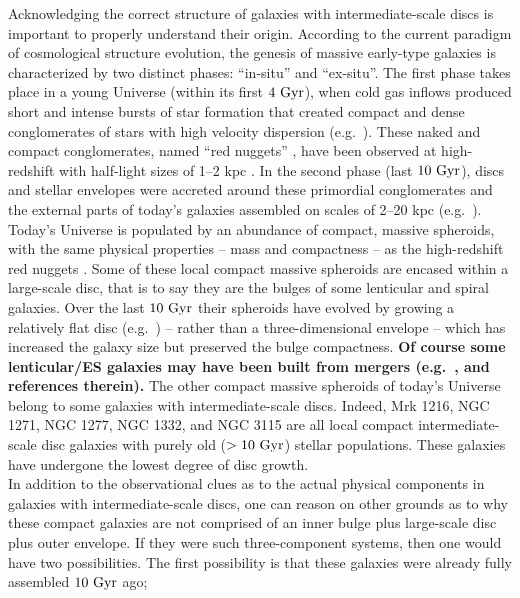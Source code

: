 \documentclass[useAMS,usenatbib,article]{mnras}
\begin{document}
Acknowledging the correct structure of galaxies with intermediate-scale discs is important to properly understand their origin. 
According to the current paradigm of cosmological structure evolution, 
the genesis of massive early-type galaxies is characterized by two distinct phases: ``in-situ'' and ``ex-situ''. 
The first phase takes place in a young Universe (within its first $4~\rm Gyr$), 
when cold gas inflows produced short and intense bursts of star formation 
that created compact and dense conglomerates of stars with high velocity dispersion (e.g.~\citealt{prieto2013}). 
These naked and compact conglomerates, named ``red nuggets'' \citep{damjanov2009}, 
have been observed at high-redshift with half-light sizes of 1--2 kpc \citep{daddi2005,trujillo2006,vandokkum2008}.
In the second phase (last $10~\rm Gyr$), discs and stellar envelopes 
were accreted around these primordial conglomerates and the external parts of today's galaxies assembled on scales of 2--20 kpc 
(e.g.~\citealt{driver2013}). \\
Today's Universe is populated by an abundance of compact, massive spheroids, 
with the same physical properties -- mass and compactness -- as the high-redshift red nuggets \citep{graham2013review,GDS2015}. 
Some of these local compact massive spheroids are encased within a large-scale disc, 
that is to say they are the bulges of some lenticular and spiral galaxies.  
Over the last $10~\rm Gyr$ their spheroids have evolved by growing a relatively flat disc (e.g.~\citealt{pichon2011,danovich2012,stewart2013})
-- rather than a three-dimensional envelope -- 
which has increased the galaxy size but preserved the bulge compactness. 
{\bf Of course some lenticular/ES galaxies may have been built from mergers (e.g.~\citealt{querejeta2015}, and references therein). }
The other compact massive spheroids of today's Universe belong to some galaxies with intermediate-scale discs. 
Indeed, Mrk 1216, NGC 1271, NGC 1277, NGC 1332, and NGC 3115 are all local compact intermediate-scale disc galaxies 
with purely old ($>10~\rm Gyr$) stellar populations. 
These galaxies have undergone the lowest degree of disc growth. \\
In addition to the observational clues as to the actual physical components in galaxies with intermediate-scale discs, 
one can reason on other grounds as to why these compact galaxies are not comprised of an inner bulge 
plus large-scale disc plus outer envelope. 
If they were such three-component systems, then one would have two possibilities. 
The first possibility is that these galaxies were already fully assembled $10~\rm Gyr$ ago; 
\end{document}
